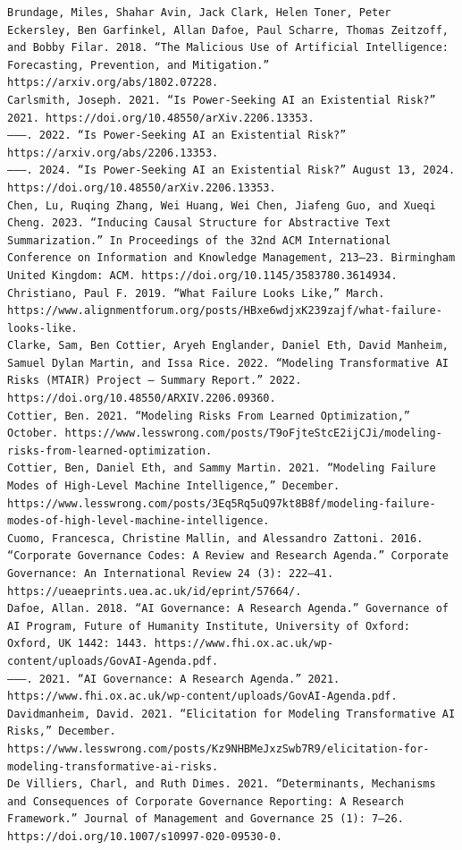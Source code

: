 \documentclass[
  11pt,
  letterpaper,
]{book}
\begin{document}
\begin{verbatim}
Brundage, Miles, Shahar Avin, Jack Clark, Helen Toner, Peter Eckersley, Ben Garfinkel, Allan Dafoe, Paul Scharre, Thomas Zeitzoff, and Bobby Filar. 2018. “The Malicious Use of Artificial Intelligence: Forecasting, Prevention, and Mitigation.” https://arxiv.org/abs/1802.07228.
Carlsmith, Joseph. 2021. “Is Power-Seeking AI an Existential Risk?” 2021. https://doi.org/10.48550/arXiv.2206.13353.
———. 2022. “Is Power-Seeking AI an Existential Risk?” https://arxiv.org/abs/2206.13353.
———. 2024. “Is Power-Seeking AI an Existential Risk?” August 13, 2024. https://doi.org/10.48550/arXiv.2206.13353.
Chen, Lu, Ruqing Zhang, Wei Huang, Wei Chen, Jiafeng Guo, and Xueqi Cheng. 2023. “Inducing Causal Structure for Abstractive Text Summarization.” In Proceedings of the 32nd ACM International Conference on Information and Knowledge Management, 213–23. Birmingham United Kingdom: ACM. https://doi.org/10.1145/3583780.3614934.
Christiano, Paul F. 2019. “What Failure Looks Like,” March. https://www.alignmentforum.org/posts/HBxe6wdjxK239zajf/what-failure-looks-like.
Clarke, Sam, Ben Cottier, Aryeh Englander, Daniel Eth, David Manheim, Samuel Dylan Martin, and Issa Rice. 2022. “Modeling Transformative AI Risks (MTAIR) Project – Summary Report.” 2022. https://doi.org/10.48550/ARXIV.2206.09360.
Cottier, Ben. 2021. “Modeling Risks From Learned Optimization,” October. https://www.lesswrong.com/posts/T9oFjteStcE2ijCJi/modeling-risks-from-learned-optimization.
Cottier, Ben, Daniel Eth, and Sammy Martin. 2021. “Modeling Failure Modes of High-Level Machine Intelligence,” December. https://www.lesswrong.com/posts/3Eq5Rq5uQ97kt8B8f/modeling-failure-modes-of-high-level-machine-intelligence.
Cuomo, Francesca, Christine Mallin, and Alessandro Zattoni. 2016. “Corporate Governance Codes: A Review and Research Agenda.” Corporate Governance: An International Review 24 (3): 222–41. https://ueaeprints.uea.ac.uk/id/eprint/57664/.
Dafoe, Allan. 2018. “AI Governance: A Research Agenda.” Governance of AI Program, Future of Humanity Institute, University of Oxford: Oxford, UK 1442: 1443. https://www.fhi.ox.ac.uk/wp-content/uploads/GovAI-Agenda.pdf.
———. 2021. “AI Governance: A Research Agenda.” 2021. https://www.fhi.ox.ac.uk/wp-content/uploads/GovAI-Agenda.pdf.
Davidmanheim, David. 2021. “Elicitation for Modeling Transformative AI Risks,” December. https://www.lesswrong.com/posts/Kz9NHBMeJxzSwb7R9/elicitation-for-modeling-transformative-ai-risks.
De Villiers, Charl, and Ruth Dimes. 2021. “Determinants, Mechanisms and Consequences of Corporate Governance Reporting: A Research Framework.” Journal of Management and Governance 25 (1): 7–26. https://doi.org/10.1007/s10997-020-09530-0.

\end{verbatim}
\end{document}
